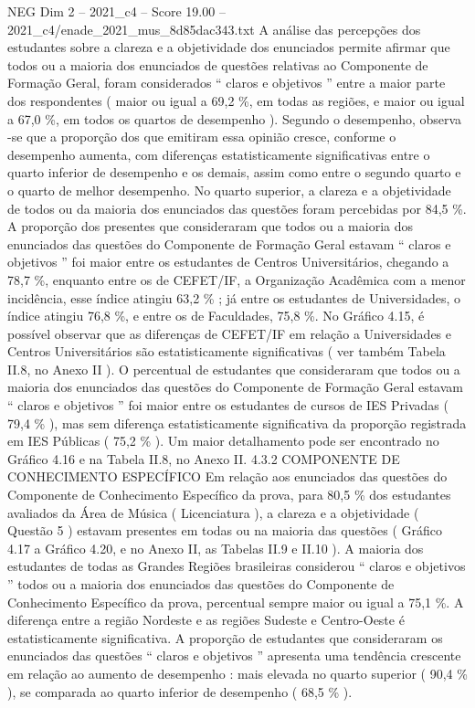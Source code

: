 \begin{textsample}{NEG Dim 2 – 2021\_c4 – Score 19.00 – 2021\_c4/enade\_2021\_mus\_8d85dac343.txt}
A análise das percepções dos estudantes sobre a clareza e a objetividade dos enunciados permite afirmar que todos ou a maioria dos enunciados de questões relativas ao Componente de Formação Geral, foram considerados “ claros e objetivos ” entre a maior parte dos respondentes ( maior ou igual a 69,2 \%, em todas as regiões, e maior ou igual a 67,0 \%, em todos os quartos de desempenho ).
Segundo o desempenho, observa -se que a proporção dos que emitiram essa opinião cresce, conforme o desempenho aumenta, com diferenças estatisticamente significativas entre o quarto inferior de desempenho e os demais, assim como entre o segundo quarto e o quarto de melhor desempenho.
No quarto superior, a clareza e a objetividade de todos ou da maioria dos enunciados das questões foram percebidas por 84,5 \%.
A proporção dos presentes que consideraram que todos ou a maioria dos enunciados das questões do Componente de Formação Geral estavam “ claros e objetivos ” foi maior entre os estudantes de Centros Universitários, chegando a 78,7 \%, enquanto entre os de CEFET/IF, a Organização Acadêmica com a menor incidência, esse índice atingiu 63,2 \% ; já entre os estudantes de Universidades, o índice atingiu 76,8 \%, e entre os de Faculdades, 75,8 \%.
No Gráfico 4.15, é possível observar que as diferenças de CEFET/IF em relação a Universidades e Centros Universitários são estatisticamente significativas ( ver também Tabela II.8, no Anexo II ).
O percentual de estudantes que consideraram que todos ou a maioria dos enunciados das questões do Componente de Formação Geral estavam “ claros e objetivos ” foi maior entre os estudantes de cursos de IES Privadas ( 79,4 \% ), mas sem diferença estatisticamente significativa da proporção registrada em IES Públicas ( 75,2 \% ).
Um maior detalhamento pode ser encontrado no Gráfico 4.16 e na Tabela II.8, no Anexo II. 4.3.2 COMPONENTE DE CONHECIMENTO ESPECÍFICO Em relação aos enunciados das questões do Componente de Conhecimento Específico da prova, para 80,5 \% dos estudantes avaliados da Área de Música ( Licenciatura ), a clareza e a objetividade ( Questão 5 ) estavam presentes em todas ou na maioria das questões ( Gráfico 4.17 a Gráfico 4.20, e no Anexo II, as Tabelas II.9 e II.10 ).
A maioria dos estudantes de todas as Grandes Regiões brasileiras considerou “ claros e objetivos ” todos ou a maioria dos enunciados das questões do Componente de Conhecimento Específico da prova, percentual sempre maior ou igual a 75,1 \%.
A diferença entre a região Nordeste e as regiões Sudeste e Centro-Oeste é estatisticamente significativa.
A proporção de estudantes que consideraram os enunciados das questões “ claros e objetivos ” apresenta uma tendência crescente em relação ao aumento de desempenho : mais elevada no quarto superior ( 90,4 \% ), se comparada ao quarto inferior de desempenho ( 68,5 \% ).

\end{textsample}
